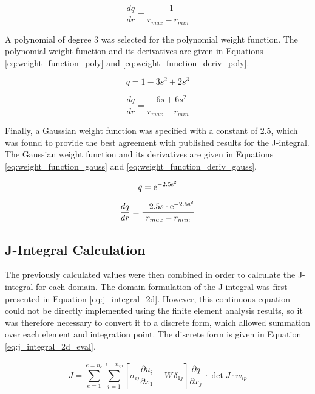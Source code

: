 \begin{equation}\label{eq:weight_function_deriv_linear}
	\frac{dq}{dr} = \frac{-1}{r_{max} - r_{min}}
\end{equation}

A polynomial of degree 3 was selected for the polynomial weight function. The polynomial weight function and its derivatives are given in Equations \ref{eq:weight_function_poly} and \ref{eq:weight_function_deriv_poly}.

\begin{equation}\label{eq:weight_function_poly}
	q = 1 - 3s^2 + 2s^3
\end{equation}

\begin{equation}\label{eq:weight_function_deriv_poly}
	\frac{dq}{dr} = \frac{-6s + 6s^2}{r_{max} - r_{min}}
\end{equation}

Finally, a Gaussian weight function was specified with a constant of 2.5, which was found to provide the best agreement with published results for the J-integral. The Gaussian weight function and its derivatives are given in Equations \ref{eq:weight_function_gauss} and \ref{eq:weight_function_deriv_gauss}.

\begin{equation}\label{eq:weight_function_gauss}
	q = \rm e^{-2.5s^2}
\end{equation}

\begin{equation}\label{eq:weight_function_deriv_gauss}
	\frac{dq}{dr} = \frac{-2.5s \cdot \rm e^{-2.5s^2}}{r_{max} - r_{min}}
\end{equation}

\subsection{J-Integral Calculation}

The previously calculated values were then combined in order to calculate the J-integral for each domain. The domain formulation of the J-integral was first presented in Equation \ref{eq:j_integral_2d}. However, this continuous equation could not be directly implemented using the finite element analysis results, so it was therefore necessary to convert it to a discrete form, which allowed summation over each element and integration point. The discrete form is given in Equation \ref{eq:j_integral_2d_eval}.

\begin{equation}\label{eq:j_integral_2d_eval}
	J = \sum_{e=1}^{e=n_{e}} \sum_{i=1}^{i=n_{ip}} \left[ \sigma_{ij}\frac{\partial u_i}{\partial x_1} - W\,\delta_{1j} \right]\frac{\partial q}{\partial x_j}\, \cdot \det J \cdot w_{ip}
\end{equation}

